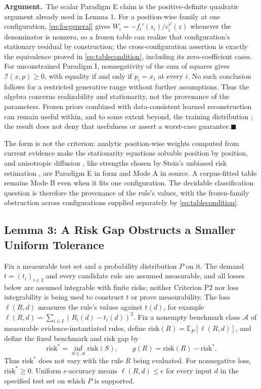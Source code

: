 \documentclass[twoside,11pt]{article}
\newcommand{\argument}{\par\medskip\noindent\textbf{Argument.}\ }
\newcommand{\qedbox}{\hfill$\blacksquare$}
\begin{document}
\argument The scalar Paradigm E claim is the positive-definite quadratic argument already used in Lemma 1. For a position-wise family at one configuration, \eqref{eq:focgeneral} gives $W_i=-f_i'(z_i)/c_i^{\varphi}(z)$ whenever the denominator is nonzero, so a frozen table can realize that configuration's stationary residual by construction; the cross-configuration assertion is exactly the equivalence proved in \eqref{eq:tablecondition}, including its zero-coefficient cases. For unconstrained Paradigm I, nonnegativity of the sum of squares gives $\mathcal{I}(x,p)\geq0$, with equality if and only if $p_i=x_i$ at every $i$. No such conclusion follows for a restricted generative range without further assumptions. Thus the algebra concerns realizability and stationarity, not the provenance of the parameters. Frozen priors combined with data-consistent learned reconstruction can remain useful within, and to some extent beyond, the training distribution \citep{haltmeier2026}; the result does not deny that usefulness or assert a worst-case guarantee.\qedbox

The form is not the criterion: analytic position-wise weights computed from current evidence make the stationarity equations solvable position by position, and anisotropic diffusion \citep{perona1990}, like strengths chosen by Stein's unbiased risk estimation \citep{stein1981}, are Paradigm E in form and Mode A in source. A corpus-fitted table remains Mode B even when it fits one configuration. The decidable classification question is therefore the provenance of the rule's values, with the frozen-family obstruction across configurations supplied separately by \eqref{eq:tablecondition}.

\subsection{Lemma 3: A Risk Gap Obstructs a Smaller Uniform Tolerance}

Fix a measurable test set and a probability distribution $P$ on it. The demand $t=(t_i)_{i\in I}$ and every candidate rule are assumed measurable, and all losses below are assumed integrable with finite risks; neither Criterion P2 nor loss integrability is being used to construct $t$ or prove measurability. The loss $\ell(R,d)$ measures the rule's values against $t(d)$, for example $\ell(R,d)=\sum_{i\in I}(R_i(d)-t_i(d))^2$. Fix a nonempty benchmark class $\mathcal{A}$ of measurable evidence-instantiated rules, define $\mathrm{risk}(R)=\mathbb{E}_P[\ell(R,d)]$, and define the fixed benchmark and risk gap by
\begin{equation}
\mathrm{risk}^* = \inf_{S\in\mathcal{A}}\mathrm{risk}(S), \qquad g(R) = \mathrm{risk}(R) - \mathrm{risk}^* .
\label{eq:gap}%
\end{equation}%
Thus $\mathrm{risk}^*$ does not vary with the rule $R$ being evaluated. For nonnegative loss, $\mathrm{risk}^*\geq0$. Uniform $\epsilon$-accuracy means $\ell(R,d)\leq\epsilon$ for every input $d$ in the specified test set on which $P$ is supported.
\end{document}
